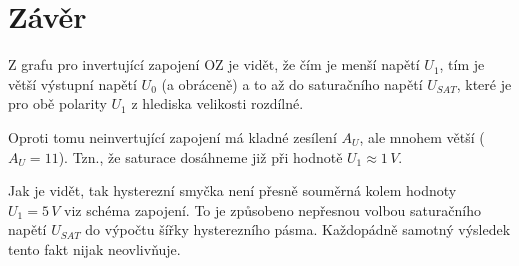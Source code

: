 \documentclass[12pt]{article} %
\begin{document}
\section{Závěr}
Z grafu pro invertující zapojení OZ je vidět, že čím je menší napětí $U_1$, tím je větší výstupní napětí $U_0$ (a obráceně) a to až do saturačního napětí $U_{SAT}$, které je pro obě polarity $U_1$ z hlediska velikosti rozdílné.

Oproti tomu neinvertující zapojení má kladné zesílení $A_U$, ale mnohem větší ($A_U=11$). Tzn., že saturace dosáhneme již při hodnotě $U_1\approx 1\,V$.

Jak je vidět, tak hysterezní smyčka není přesně souměrná kolem hodnoty $U_1=5\,V$ viz schéma zapojení. To je způsobeno nepřesnou volbou saturačního napětí $U_{SAT}$ do výpočtu šířky hysterezního pásma. Každopádně samotný výsledek tento fakt nijak neovlivňuje.
\end{document}
